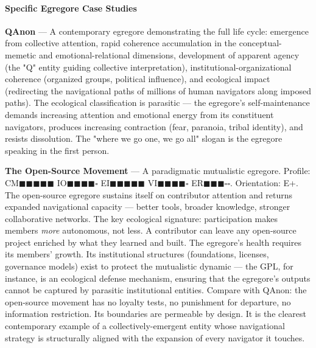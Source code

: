 \paragraph*{Specific Egregore Case Studies}


\textbf{QAnon} — A contemporary egregore demonstrating the full life cycle: emergence from collective attention, rapid coherence accumulation in the conceptual-memetic and emotional-relational dimensions, development of apparent agency (the "Q" entity guiding collective interpretation), institutional-organizational coherence (organized groups, political influence), and ecological impact (redirecting the navigational paths of millions of human navigators along imposed paths). The ecological classification is parasitic — the egregore's self-maintenance demands increasing attention and emotional energy from its constituent navigators, produces increasing contraction (fear, paranoia, tribal identity), and resists dissolution. The "where we go one, we go all" slogan is the egregore speaking in the first person.


\textbf{The Open-Source Movement} — A paradigmatic mutualistic egregore. Profile: CM$\blacksquare$$\blacksquare$$\blacksquare$$\blacksquare$$\blacksquare$ IO$\blacksquare$$\blacksquare$$\blacksquare$$\blacksquare$$\square$ EI$\blacksquare$$\blacksquare$$\blacksquare$$\blacksquare$$\blacksquare$ VI$\blacksquare$$\blacksquare$$\blacksquare$$\blacksquare$$\square$ ER$\blacksquare$$\blacksquare$$\blacksquare$$\square$$\square$. Orientation: E+. The open-source egregore sustains itself on contributor attention and returns expanded navigational capacity — better tools, broader knowledge, stronger collaborative networks. The key ecological signature: participation makes members \textit{more} autonomous, not less. A contributor can leave any open-source project enriched by what they learned and built. The egregore's health requires its members' growth. Its institutional structures (foundations, licenses, governance models) exist to protect the mutualistic dynamic — the GPL, for instance, is an ecological defense mechanism, ensuring that the egregore's outputs cannot be captured by parasitic institutional entities. Compare with QAnon: the open-source movement has no loyalty tests, no punishment for departure, no information restriction. Its boundaries are permeable by design. It is the clearest contemporary example of a collectively-emergent entity whose navigational strategy is structurally aligned with the expansion of every navigator it touches.



